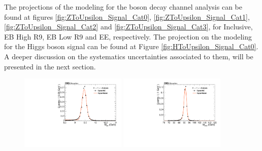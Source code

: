 The projections of the modeling for the \Z boson decay channel analysis can be found at figures \ref{fig:ZToUpsilon_Signal_Cat0}, \ref{fig:ZToUpsilon_Signal_Cat1}, \ref{fig:ZToUpsilon_Signal_Cat2} and \ref{fig:ZToUpsilon_Signal_Cat3}, for Inclusive, EB High R9, EB Low R9 and EE, respectively. The projection on the modeling for the Higgs boson signal can be found at Figure \ref{fig:HToUpsilon_Signal_Cat0}. A deeper discussion on the systematics uncertainties associated to them, will be presented in the next section.



\begin{figure}[!htbp]
\begin{center}


\includegraphics[width=0.45\textwidth]{figures_and_tables/fitPlotFiles2D/ZToUpsilonPhotonSignalAndBackgroundFit/mMuMNU_ZToUpsilon1SPhotonSignalAndBackgroundFit_Signal_Cat0}\hspace*{1.cm}
\includegraphics[width=0.45\textwidth]{figures_and_tables/fitPlotFiles2D/ZToUpsilonPhotonSignalAndBackgroundFit/mHZ_ZToUpsilon1SPhotonSignalAndBackgroundFit_Signal_Cat0_default}\hspace*{1.cm}


\end{center}
\end{figure}
